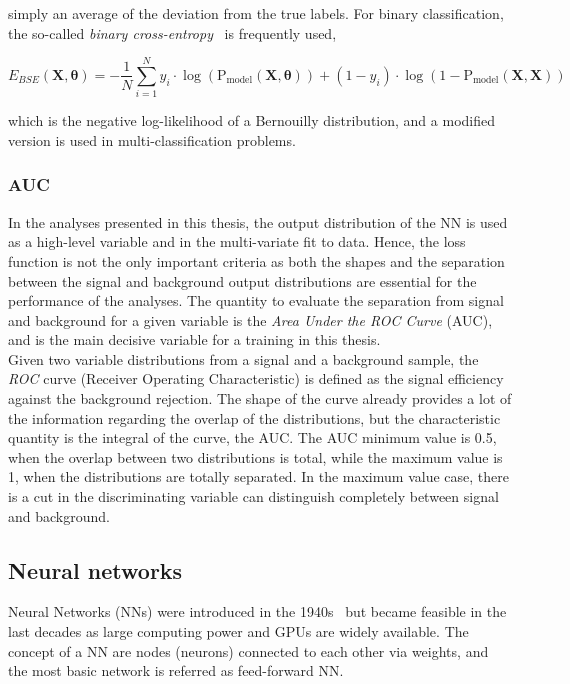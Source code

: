 simply an average of the deviation from the true labels. For binary classification, the so-called \textit{binary cross-entropy}~\cite{binarycross} is frequently used, 

\begin{equation}
    E_{BSE}(\mathbf{X},\boldsymbol{\theta}) = -\frac{1}{N}\sum_{i=1}^N y_i\cdot\log(\text{P}_\text{model}(\mathbf{X},\boldsymbol{\theta}))+(1-y_i)\cdot\log(1-\text{P}_\text{model}(\mathbf{X},\mathbf{X}))
\end{equation}

which is the negative log-likelihood of a Bernouilly distribution, and a modified version is used in multi-classification problems. 

\subsubsection{AUC}

In the analyses presented in this thesis, the output distribution of the NN is used as a high-level variable and in the  multi-variate fit to data. Hence, the loss function is not the only important criteria as both the shapes and the separation between the signal and background output distributions are essential for the performance of the analyses. The quantity to evaluate the separation from signal and background for a given variable is the \textit{Area Under the ROC Curve} (AUC), and is the main decisive variable for a training in this thesis.\\

Given two variable distributions from a signal and a background sample, the \textit{ROC} curve (Receiver Operating Characteristic) is defined as the signal efficiency against the background rejection. The shape of the curve already provides a lot of the information regarding the overlap of the distributions, but the characteristic quantity is the integral of the curve, the AUC. The AUC minimum value is 0.5, when the overlap between two distributions is total, while the maximum value is 1, when the distributions are totally separated. In the maximum value case, there is a cut in the discriminating variable can distinguish completely between signal and background.

\subsection{Neural networks}
\label{ML:SectionNN}
Neural Networks (NNs) were introduced in the 1940s~\cite{McCulloch1943} but became feasible in the last decades as large computing power and GPUs are widely available. The concept of a NN are nodes (neurons) connected to each other via weights, and the most basic network is referred as feed-forward NN.\\

